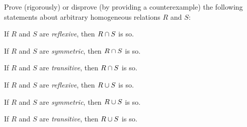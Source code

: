\documentclass[a4paper,12pt]{article}
\begin{document}
\begin{tasks}
\begin{multicols}{2}
\begin{subtasks}




    \end{subtasks}
    \end{multicols}


    \item Prove (rigorously) or disprove (by providing a counterexample) the following statements about arbitrary homogeneous relations $R$ and $S$:

    \begin{multicols}{2}
    \begin{subtasks}
        \item If $R$ and $S$ are \textit{reflexive}, then $R \cap S$ is so.
        \item If $R$ and $S$ are \textit{symmetric}, then $R \cap S$ is so.
        \item If $R$ and $S$ are \textit{transitive}, then $R \cap S$ is so.
        \item If $R$ and $S$ are \textit{reflexive}, then $R \cup S$ is so.
        \item If $R$ and $S$ are \textit{symmetric}, then $R \cup S$ is so.
        \item If $R$ and $S$ are \textit{transitive}, then $R \cup S$ is so.
    \end{subtasks}
    \end{multicols}



\end{tasks}
\end{document}
